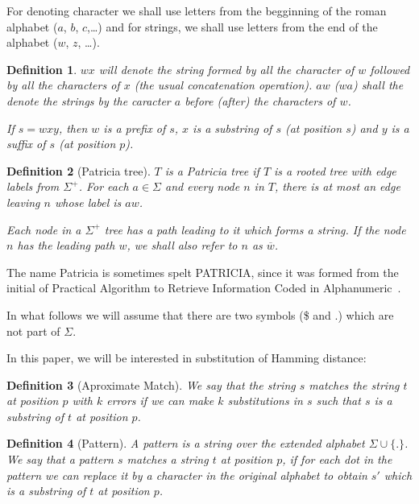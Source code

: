 \documentclass[letter,10pt]{article}
\newtheorem{definition}{Definition}
\begin{document}
For denoting character we shall use letters from the begginning of the roman alphabet ($a$, $b$, $c$,\ldots) and for strings, we shall use letters from the end of the alphabet ($w$, $z$, \ldots).

\begin{definition}
$wx$ will denote the string formed by all the character of $w$ followed by all the characters of $x$ (the usual concatenation operation). $aw$ ($wa$) shall the denote the strings by the caracter $a$ before (after) the characters of $w$.

If $s = wxy$, then $w$ is a \emph{prefix} of $s$, $x$ is a \emph{substring} of $s$ (at position $s$) and $y$ is a \emph{suffix} of $s$ (at position $p$).
\end{definition}

\begin{definition}[Patricia tree]
$T$ is a Patricia tree if $T$ is a rooted tree with edge labels from $\Sigma^+$. For each $a \in \Sigma$ and every node $n$ in $T$, there is at most an edge leaving $n$ whose label is $aw$.

Each node in a $\Sigma^+$ tree has a path leading to it which forms a string. If the node $n$ has the leading path $w$, we shall also refer to $n$ as $\overline{w}$.
\end{definition}

The name Patricia is sometimes spelt PATRICIA, since it was formed from the initial of Practical Algorithm to Retrieve Information Coded in Alphanumeric~\cite{morrison:patricia}.

In what follows we will assume that there are two symbols (\$ and $.$) which are not part of $\Sigma$.

In this paper, we will be interested in substitution of Hamming distance:

\begin{definition}[Aproximate Match]
We say that the string $s$ matches the string $t$ at position $p$ with $k$ errors if we can make $k$ substitutions in $s$ such that $s$ is a substring of $t$ at position $p$.
\end{definition}


\begin{definition}[Pattern]
A pattern is a string over the extended alphabet $\Sigma\cup\{.\}$. We say that a pattern $s$ matches a string $t$ at position $p$, if for each dot in the pattern we can replace it by a character in the original alphabet to obtain $s'$ which is a substring of $t$ at position $p$.
\end{definition}
\end{document}
